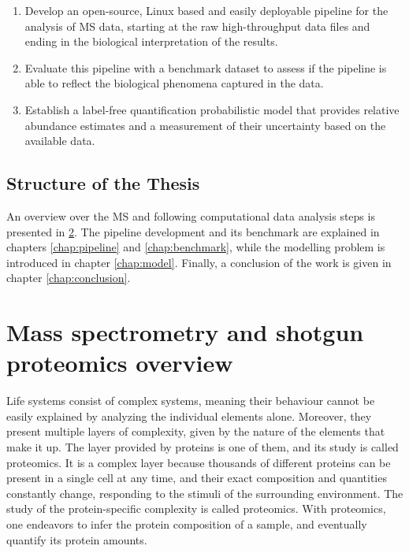 \documentclass[11pt, a4paper]{report}
\begin{document}
\begin{enumerate}

\item Develop an open-source, Linux based and easily deployable pipeline for the analysis of \ac{MS} data, starting at the raw high-throughput data files and ending in the  biological interpretation of the results.

\item Evaluate this pipeline with a benchmark dataset to assess if the pipeline is able to reflect the biological phenomena captured in the data.

\item Establish a label-free quantification probabilistic model that provides relative abundance estimates and a measurement of their uncertainty based on the available data.

\end{enumerate}

\section{Structure of the Thesis}

An overview over the \ac{MS} and following computational data analysis steps is presented in \ref{chap:mass_spec}. The pipeline development and its benchmark are explained in chapters \ref{chap:pipeline} and \ref{chap:benchmark}, while the modelling problem is introduced in chapter \ref{chap:model}. Finally, a conclusion of the work is given in chapter \ref{chap:conclusion}.


\chapter{Mass spectrometry and shotgun proteomics overview}
\label{chap:mass_spec}

Life systems consist of complex systems, meaning their behaviour cannot be easily explained by analyzing the individual elements alone. Moreover, they present multiple layers of complexity, given by the nature of the elements that make it up. The layer provided by proteins is one of them, and its study is called proteomics. It is a complex layer because thousands of different proteins can be present in a single cell at any time, and their exact composition and quantities constantly change, responding to the stimuli of the surrounding environment. The study of the protein-specific complexity is called proteomics. With proteomics, one endeavors to infer the protein composition of a sample, and eventually quantify its protein amounts.
\end{document}
